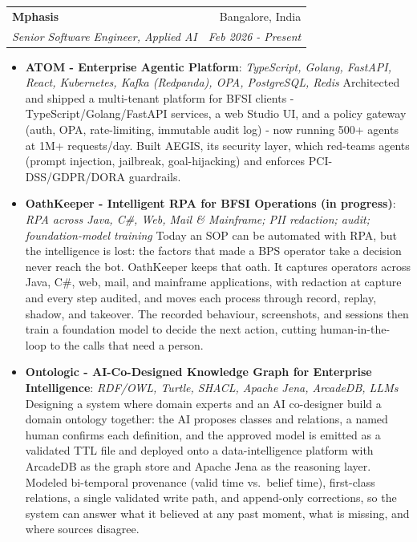 \documentclass[a4paper,11pt]{article}
\makeatletter
\newcommand{\resumeItem}[2]{\item\small{\textbf{#1}{: #2 \vspace{-1pt}}}}
\newcommand{\resumeSubheading}[4]{\vspace{-1pt}\item
    \begin{tabular*}{0.97\textwidth}{l@{\extracolsep{\fill}}r}
      \textbf{#1} & #2 \\
      \textit{#3} & \textit{#4} \\
    \end{tabular*}\vspace{-4pt}}
\newcommand{\resumeItemListStart}{\begin{itemize}}
\newcommand{\resumeItemListEnd}{\end{itemize}\vspace{-4pt}}
\makeatother
\begin{document}
  \resumeSubheading{Mphasis}{Bangalore, India}
    {Senior Software Engineer, Applied AI}{Feb 2026 - Present}
    \resumeItemListStart
        \resumeItem{ATOM - Enterprise Agentic Platform}
          {\textit{TypeScript, Golang, FastAPI, React, Kubernetes, Kafka (Redpanda), OPA, PostgreSQL, Redis}\newline
          Architected and shipped a multi-tenant platform for BFSI clients - TypeScript/Golang/FastAPI services, a web Studio UI, and a policy gateway (auth, OPA, rate-limiting, immutable audit log) - now running 500+ agents at 1M+ requests/day. Built AEGIS, its security layer, which red-teams agents (prompt injection, jailbreak, goal-hijacking) and enforces PCI-DSS/GDPR/DORA guardrails.}
        \resumeItem{OathKeeper - Intelligent RPA for BFSI Operations (in progress)}
          {\textit{RPA across Java, C\#, Web, Mail \& Mainframe; PII redaction; audit; foundation-model training}\newline
          Today an SOP can be automated with RPA, but the intelligence is lost: the factors that made a BPS operator take a decision never reach the bot. OathKeeper keeps that oath. It captures operators across Java, C\#, web, mail, and mainframe applications, with redaction at capture and every step audited, and moves each process through record, replay, shadow, and takeover. The recorded behaviour, screenshots, and sessions then train a foundation model to decide the next action, cutting human-in-the-loop to the calls that need a person.}
        \resumeItem{Ontologic - AI-Co-Designed Knowledge Graph for Enterprise Intelligence}
          {\textit{RDF/OWL, Turtle, SHACL, Apache Jena, ArcadeDB, LLMs}\newline
          Designing a system where domain experts and an AI co-designer build a domain ontology together: the AI proposes classes and relations, a named human confirms each definition, and the approved model is emitted as a validated TTL file and deployed onto a data-intelligence platform with ArcadeDB as the graph store and Apache Jena as the reasoning layer. Modeled bi-temporal provenance (valid time vs.\ belief time), first-class relations, a single validated write path, and append-only corrections, so the system can answer what it believed at any past moment, what is missing, and where sources disagree.}
    \resumeItemListEnd
\end{document}
